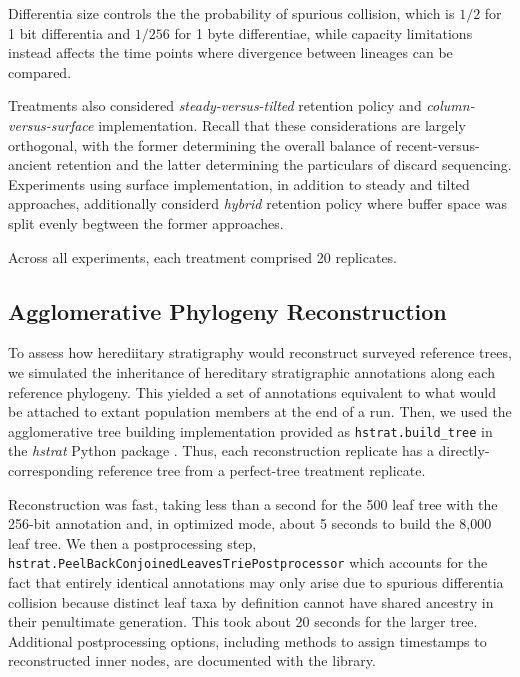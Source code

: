 Differentia size controls the the probability of spurious collision, which is $1/2$ for 1 bit differentia and $1/256$ for 1 byte differentiae, while capacity limitations instead affects the time points where divergence between lineages can be compared.

Treatments also considered \textit{steady-versus-tilted} retention policy and \textit{column-versus-surface} implementation.
Recall that these considerations are largely orthogonal, with the former determining the overall balance of recent-versus-ancient retention and the latter determining the particulars of discard sequencing.
Experiments using surface implementation, in addition to steady and tilted approaches, additionally considerd \textit{hybrid} retention policy where buffer space was split evenly begtween the former approaches.

Across all experiments, each treatment comprised 20 replicates.

\subsection{Agglomerative Phylogeny Reconstruction}

To assess how herediitary stratigraphy would reconstruct surveyed reference trees, we simulated the inheritance of hereditary stratigraphic annotations along each reference phylogeny.
This yielded a set of annotations equivalent to what would be attached to extant population members at the end of a run.
Then, we used the agglomerative tree building implementation provided as \texttt{hstrat.build\_tree} in the \textit{hstrat} Python package \citep{moreno2022hstrat}.
Thus, each reconstruction replicate has a directly-corresponding reference tree from a perfect-tree treatment replicate.

Reconstruction was fast, taking less than a second for the 500 leaf tree with the 256-bit annotation and,
in optimized mode, about 5 seconds to build the 8,000 leaf tree.
We then a postprocessing step, \texttt{hstrat.{\allowbreak}Peel{\allowbreak}Back{\allowbreak}Conjoined{\allowbreak}Leave{\allowbreak}sTrie{\allowbreak}Postprocessor} which accounts for the fact that entirely identical annotations may only arise due to spurious differentia collision because distinct leaf taxa by definition cannot have shared ancestry in their penultimate generation.
This took about 20 seconds for the larger tree.
Additional postprocessing options, including methods to assign timestamps to reconstructed inner nodes, are documented with the library.

